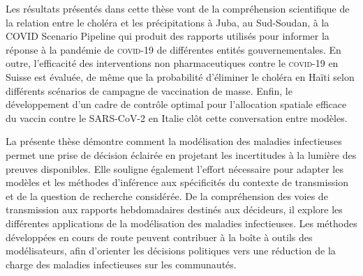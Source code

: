 Les résultats présentés dans cette thèse vont de la compréhension scientifique de la relation entre le choléra et les précipitations à Juba, au Sud-Soudan, à la COVID Scenario Pipeline qui produit des rapports utilisés pour informer la réponse à la pandémie de \textsc{covid}-19 de différentes entités gouvernementales. En outre, l'efficacité des interventions non pharmaceutiques contre le \textsc{covid}-19 en Suisse est évaluée, de même que la probabilité d'éliminer le choléra en Haïti selon différents scénarios de campagne de vaccination de masse. Enfin, le développement d'un cadre de contrôle optimal pour l'allocation spatiale efficace du vaccin contre le SARS-CoV-2 en Italie clôt cette conversation entre modèles.

La présente thèse démontre comment la modélisation des maladies infectieuses permet une prise de décision éclairée en projetant les incertitudes à la lumière des preuves disponibles. Elle souligne également l'effort nécessaire pour adapter les modèles et les méthodes d'inférence aux spécificités du contexte de transmission et de la question de recherche considérée. De la compréhension des voies de transmission aux rapports hebdomadaires destinés aux décideurs, il explore les différentes applications de la modélisation des maladies infectieuses. Les méthodes développées en cours de route peuvent contribuer à la boîte à outils des modélisateurs, afin d'orienter les décisions politiques vers une réduction de la charge des maladies infectieuses sur les communautés.


